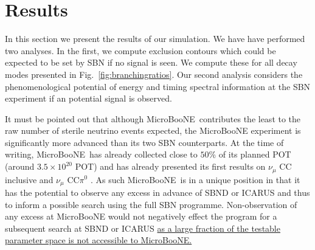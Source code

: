 \documentclass[11pt, a4paper]{article}
\newcommand{\reffig}[1]{Fig.~\ref{#1}}
\def\muboone{MicroBooNE}
\def\ster{\ensuremath N}
\newcommand{\newtext}[2]{\textcolor{#1}{\ul{#2}}}
\begin{document}
\section{\label{sec:sensitivities}Results}

In this section we present the results of our simulation. We have have
performed two analyses. In the first, we compute exclusion contours which could
be expected to be set by SBN if no signal is seen. We compute these for all
decay modes presented in \reffig{fig:branchingratios}. Our second analysis
considers the phenomenological potential of energy and timing spectral information at the SBN
experiment if an potential signal is observed. 

It must be pointed out that although \muboone\ contributes the least to the raw
number of sterile neutrino events expected, the MicroBooNE experiment is
significantly more advanced than its two SBN counterparts. At the time of
writing, \muboone\ has already collected close to $50$\% of its planned POT
(around $3.5\times 10^{20}$ POT) and has already presented its first results on
$\nu_\mu$ CC inclusive and $\nu_\mu$ CC$\pi^0$ \cite{mubooneneutrino}. As such
\muboone\ is in a unique position in that it has the potential to observe any
excess in advance of SBND or ICARUS and thus to inform a possible search using
the full SBN programme.
%
%
Non-observation of any excess at MicroBooNE would not negatively effect the
program for a subsequent search at SBND or ICARUS \newtext{PB}{as a large
fraction of the testable parameter space is not accessible to MicroBooNE.}
\end{document}
